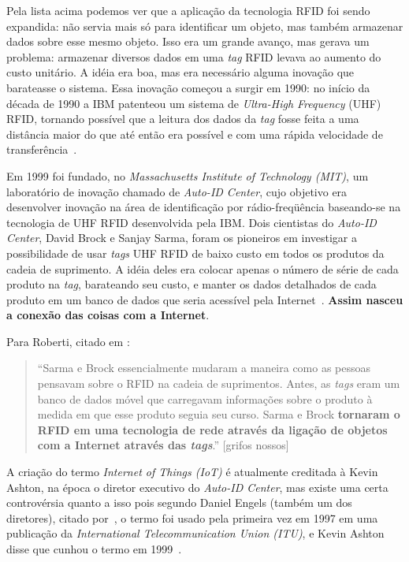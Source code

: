\documentclass[pdftex, brazil, 12pt, twoside]{article}
\newcommand{\ingles}[1]{\textit{#1}}
\begin{document}
Pela lista acima podemos ver que a aplicação da tecnologia RFID foi sendo
expandida: não servia mais só para identificar um objeto, mas também armazenar
dados sobre esse mesmo objeto. Isso era um grande avanço, mas gerava um problema:
armazenar diversos dados em uma \ingles{tag} RFID levava ao aumento do custo
unitário. A idéia era boa, mas era necessário alguma inovação que barateasse o
sistema. Essa inovação começou a surgir em 1990: no início da década de 1990
a IBM patenteou um sistema de \emph{Ultra-High Frequency} (UHF) RFID, tornando
possível que a leitura dos dados da \emph{tag} fosse feita a uma distância maior
do que até então era possível e com uma rápida velocidade de
transferência~\citep{IEEEIoTDefinition}.

Em 1999 foi fundado, no \ingles{Massachusetts Institute of Technology (MIT)}, um
laboratório de inovação chamado de \emph{Auto-ID Center}, cujo objetivo era
desenvolver inovação na área de identificação por rádio-freqüência baseando-se
na tecnologia de UHF RFID desenvolvida pela IBM. Dois cientistas do \ingles{Auto-ID Center},
David Brock e Sanjay Sarma, foram os pioneiros em investigar a possibilidade
de usar \ingles{tags} UHF RFID de baixo custo em todos os produtos da cadeia
de suprimento. A idéia deles era colocar apenas o número de série de cada produto
na \ingles{tag}, barateando seu custo, e manter os dados detalhados de cada
produto em um banco de dados que seria acessível pela Internet~\citep{IEEEIoTDefinition}.
\textbf{Assim nasceu a conexão das coisas com a Internet}.

Para Roberti, citado em \citet{IEEEIoTDefinition}:
\begin{quote}
``Sarma e Brock
essencialmente mudaram a maneira como as pessoas pensavam sobre o RFID na
cadeia de suprimentos. Antes, as \ingles{tags} eram um banco de dados móvel
que carregavam informações sobre o produto à medida em que esse produto
seguia seu curso. Sarma e Brock \textbf{tornaram o RFID em uma tecnologia de rede
  através da ligação de objetos com a Internet através das \ingles{tags}}.'' [grifos
  nossos]
\end{quote}

A criação do termo \ingles{Internet of Things (IoT)} é atualmente creditada à Kevin Ashton,
na época o diretor executivo do \ingles{Auto-ID Center}, mas existe uma certa
controvérsia quanto a isso pois segundo Daniel Engels (também um dos
diretores), citado por~\citet{IEEEIoTDefinition},
o termo foi usado pela primeira vez em 1997 em uma publicação da
\ingles{International Telecommunication Union (ITU)}, e Kevin Ashton disse
que cunhou o termo em 1999~\citep{AshtonIoT2009,PressIoT2014}.
\end{document}
